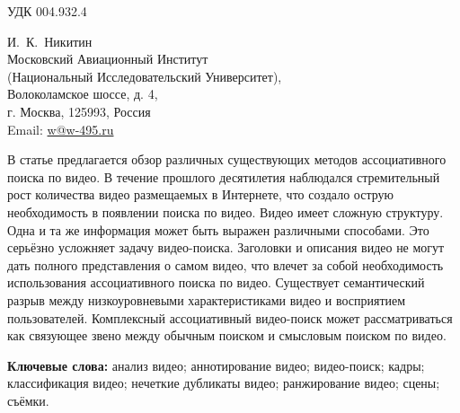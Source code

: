 

\noindent УДК 004.932.4


\begin{flushright}
\sf\small
И. К. Никитин \\
Московский Авиационный Институт \\
(Национальный Исследовательский Университет), \\
Волоколамское шоссе, д. 4, \\
г. Москва, 125993, Россия \\
Email: \href{mailto:w@w-495.ru}{w@w-495.ru}
\end{flushright}




В статье предлагается обзор различных существующих методов
ассоциативного поиска по видео.
В течение прошлого десятилетия наблюдался стремительный рост
количества видео размещаемых в Интернете,
что создало острую необходимость в появлении поиска по видео.
Видео имеет сложную структуру. Одна и та же информация
может быть выражен различными способами.
Это серьёзно усложняет задачу видео-поиска.
Заголовки и описания видео не могут
дать полного представления о самом видео,
что влечет за собой необходимость использования
ассоциативного поиска по видео.
Существует семантический разрыв между низкоуровневыми
характеристиками видео и восприятием пользователей.
Комплексный ассоциативный видео-поиск
может рассматриваться как связующее звено между обычным поиском
и смысловым поиском по видео.

{\bf Ключевые слова:}
анализ видео;
аннотирование видео;
видео-поиск;
кадры;
классификация видео;
нечеткие дубликаты видео;
ранжирование видео;
сцены;
съёмки.


